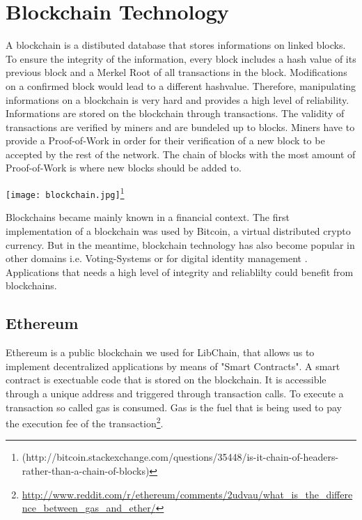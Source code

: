 \chapter{Blockchain Technology\label{cha:chapter1}}

A blockchain is a distibuted database that stores informations on linked blocks. To ensure the integrity of the information, every block includes a hash value of its previous block and a Merkel Root of all transactions in the block. Modifications on a confirmed block would lead to a different hashvalue. Therefore, manipulating informations on a blockchain is very hard and provides a high level of reliability.
Informations are stored on the blockchain through transactions. The validity of transactions are verified by miners and are bundeled up to blocks. Miners have to provide a Proof-of-Work in order for their verification of a new block to be accepted by the rest of the network. The chain of blocks with the most amount of Proof-of-Work is where new blocks should be added to. 

\vspace{0.3cm}
\texttt{[image: blockchain.jpg]}\footnote{(http://bitcoin.stackexchange.com/questions/35448/is-it-chain-of-headers-rather-than-a-chain-of-blocks)}

Blockchains became mainly known in a financial context. The first implementation of a blockchain was used by Bitcoin, a virtual distributed crypto currency.
But in the meantime, blockchain technology has also become popular in other domains i.e. Voting-Systems \cite{yermack2017corporate} or for digital identity management \cite{isaen}. Applications that needs a high level of integrity and reliablilty could benefit from blockchains.

\section{Ethereum}
Ethereum is a public blockchain we used for LibChain, that allows us to implement decentralized applications by means of "Smart Contracts". A smart contract is exectuable code that is stored on the blockchain. It is accessible through a unique address and triggered through transaction calls.
To execute a transaction so called gas is consumed. Gas is the fuel that is being used to pay the execution fee of the transaction\footnote{\url{http://www.reddit.com/r/ethereum/comments/2udvau/what_is_the_difference_between_gas_and_ether/}}.

